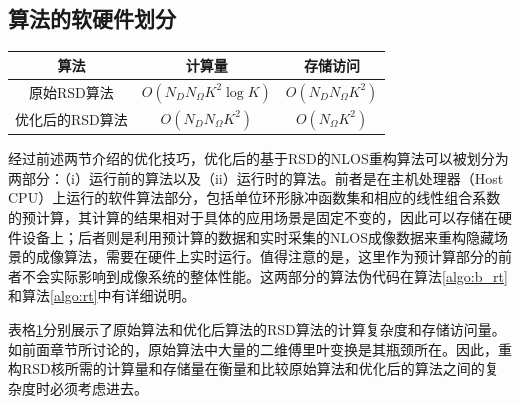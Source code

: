 \documentclass[master]{shtthesis}             %
\begin{document}
\subsection{算法的软硬件划分}\label{sec:sw_hw_sep}

\begin{table}[!t]
    \centering
    \label{tab:fuzadu_comp}
        \begin{tabular}{@{}ccc@{}}
            \toprule
            算法               & 计算量 & 存储访问 \\ \midrule
            原始RSD算法 & $O(N_DN_{\Omega}K^2\log K)$          & $O(N_DN_{\Omega}K^2)$             \\
            优化后的RSD算法& $O(N_DN_{\Omega}K^2)$              & $O(N_{\Omega}K^2)$             \\ \bottomrule
        \end{tabular}%
\end{table}

经过前述两节介绍的优化技巧，优化后的基于RSD的NLOS重构算法可以被划分为两部分：（i）运行前的算法以及（ii）运行时的算法。前者是在主机处理器（Host CPU）上运行的软件算法部分，包括单位环形脉冲函数集和相应的线性组合系数的预计算，其计算的结果相对于具体的应用场景是固定不变的，因此可以存储在硬件设备上；后者则是利用预计算的数据和实时采集的NLOS成像数据来重构隐藏场景的成像算法，需要在硬件上实时运行。值得注意的是，这里作为预计算部分的前者不会实际影响到成像系统的整体性能。这两部分的算法伪代码在算法\ref{algo:b_rt}和算法\ref{algo:rt}中有详细说明。

表格\ref{tab:fuzadu_comp}分别展示了原始算法和优化后算法的RSD算法的计算复杂度和存储访问量。如前面章节所讨论的，原始算法中大量的二维傅里叶变换是其瓶颈所在。因此，重构RSD核所需的计算量和存储量在衡量和比较原始算法和优化后的算法之间的复杂度时必须考虑进去。
\end{document}
